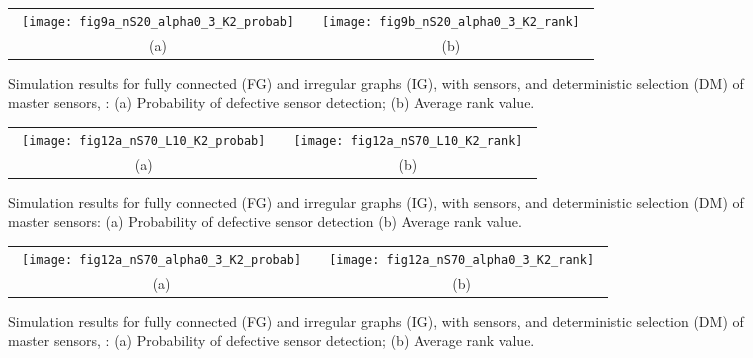 \documentclass[journal]{IEEEtran}
\begin{document}
\begin{figure*}[htb]
\begin{center}
\begin{tabular}{cc}
~\texttt{[image: fig9a\_nS20\_alpha0\_3\_K2\_probab]}~&
~\texttt{[image: fig9b\_nS20\_alpha0\_3\_K2\_rank]}~\\
~(a)~&~(b)~\\\end{tabular}
\end{center}
\caption{Simulation results for fully connected (FG) and irregular graphs (IG),  with  sensors,  and deterministic selection (DM) of master sensors, : (a) Probability of defective sensor detection; (b) Average rank value.}
\label{fig:20sens_irregular1_alpha0_7_K2}
\end{figure*}
\begin{figure*}[htb]
\begin{center}
\begin{tabular}{cc}
~\texttt{[image: fig12a\_nS70\_L10\_K2\_probab]}~&
~\texttt{[image: fig12a\_nS70\_L10\_K2\_rank]}~\\
~(a)~&~(b)~\\\end{tabular}
\end{center}
\caption{Simulation results for fully connected (FG) and irregular graphs (IG),  with  sensors,  and deterministic selection (DM) of  master sensors: (a) Probability of defective sensor detection (b) Average rank value.}
\label{fig:70sens_irregular_L10_K2}
\end{figure*}
\begin{figure*}[htb]
\begin{center}
\begin{tabular}{cc}
~\texttt{[image: fig12a\_nS70\_alpha0\_3\_K2\_probab]}~&
~\texttt{[image: fig12a\_nS70\_alpha0\_3\_K2\_rank]}~\\
~(a)~&~(b)~\\\end{tabular}
\end{center}
\caption{Simulation results for fully connected (FG) and irregular graphs (IG),  with  sensors,  and deterministic selection (DM) of master sensors, : (a) Probability of defective sensor detection; (b) Average rank value.}
\label{fig:70sens_irregular1_alpha0_3_K2}
\end{figure*}
\end{document}
